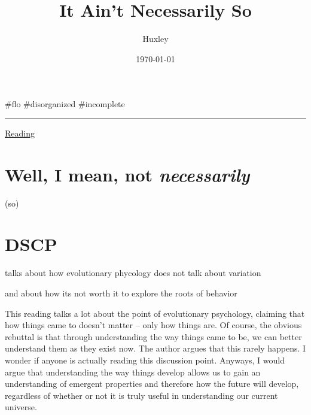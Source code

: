 \documentclass[letterpaper]{article}
\author{Huxley}
\date{\today}
\title{It Ain't Necessarily So}
\renewcommand\maketitle{}
\begin{document}
\maketitle
\#flo \#disorganized \#incomplete

\noindent\rule{\textwidth}{0.5pt}

\href{https://www.newyorker.com/magazine/2012/09/17/it-aint-necessarily-so}{Reading}

\section{Well, I mean, not \emph{necessarily}}
\label{sec:org88218e7}
(so)

\section{DSCP}
\label{sec:org6c4db8a}
talks about how evolutionary phycology does not talk about variation

and about how its not worth it to explore the roots of behavior

This reading talks a lot about the point of evolutionary psychology,
claiming that how things came to doesn't matter -- only how things are.
Of course, the obvious rebuttal is that through understanding the way
things came to be, we can better understand them as they exist now. The
author argues that this rarely happens. I wonder if anyone is actually
reading this discussion point. Anyways, I would argue that understanding
the way things develop allows us to gain an understanding of emergent
properties and therefore how the future will develop, regardless of
whether or not it is truly useful in understanding our current universe.
\end{document}
